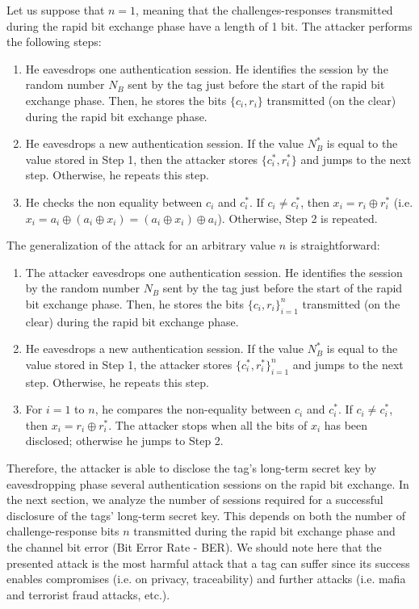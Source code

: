 \documentclass{article}
\newenvironment{proof}[1][Proof]{\begin{trivlist}
\item[\hskip \labelsep {\bfseries #1}]}{\end{trivlist}}
\begin{document}
\begin{proof}

Let us suppose that $n=1$, meaning that the challenges-responses transmitted during the rapid bit exchange phase have a length of 1 bit. The attacker performs the following steps:
\begin{enumerate}
  \item  He eavesdrops one authentication session. He identifies the session by the random number $N_B$ sent by the tag just before the start of the rapid bit exchange phase.  Then, he stores the bits $\{c_i, r_i\}$ transmitted (on the clear) during the rapid bit exchange phase.
  \item  He eavesdrops a new authentication session. If the value $N^*_B$ is equal to the value stored in Step 1, then the attacker stores $\{c^*_i, r^*_i\}$ and jumps to the next step. Otherwise, he repeats this step.
  \item  He checks the non equality between $c_i$ and $c^*_i$. If $c_i \neq c^*_i$, then $x_i = r_i \oplus r^*_i$ (i.e. $x_i = a_i \oplus (a_i \oplus x_i) =  (a_i \oplus x_i) \oplus a_i $). Otherwise, Step 2 is repeated.
\end{enumerate}

The generalization of the attack for an arbitrary value $n$ is straightforward:
\begin{enumerate}
  \item  The attacker eavesdrops one authentication session. He identifies the session by the random number $N_B$ sent by the tag just before the start of the rapid bit exchange phase.  Then, he stores the bits $\{c_i, r_i\}_{i=1}^n$ transmitted (on the clear) during the rapid bit exchange phase.
  \item  He eavesdrops a new authentication session. If the value $N^*_B$ is equal to the value stored in Step 1, the attacker stores $\{c^*_i, r^*_i\}_{i=1}^n$ and jumps to the next step. Otherwise, he repeats this step.
  \item  For $i=1$ to $n$, he compares the non-equality between $c_i$ and $c^*_i$. If $c_i \neq c^*_i$, then $x_i = r_i \oplus r^*_i$.  The attacker stops when all the bits of $x_i$ has been disclosed; otherwise he jumps to Step 2. \end{enumerate}

\end{proof}

Therefore, the attacker is able to disclose the tag's long-term secret key by eavesdropping phase several authentication sessions on the rapid bit exchange. In the next section, we analyze the number of sessions required for a successful disclosure of the tags' long-term secret key. This depends on both the number of challenge-response bits $n$ transmitted during the rapid bit exchange phase and the channel bit error (Bit Error Rate - BER).  We should note here that the presented attack is the most harmful attack that a tag can suffer since its success enables compromises (i.e. on privacy, traceability) and further attacks (i.e. mafia and terrorist fraud attacks, etc.).
\end{document}
